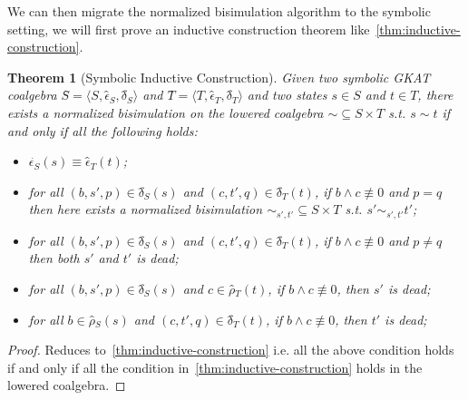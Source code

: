 \documentclass{extarticle}
\newtheorem{theorem}{Theorem}
\begin{document}
We can then migrate the normalized bisimulation algorithm to the symbolic setting, we will first prove an inductive construction theorem like~\cref{thm:inductive-construction}.

\begin{theorem}[Symbolic Inductive Construction]\label{thm:symb-inductive-construction}
    Given two symbolic GKAT coalgebra \(Ŝ = ⟨S, ϵ̂_S, δ̂_S⟩\) and \(T̂ = ⟨T, ϵ̂_T, δ̂_T⟩\) and two states \(s ∈ S\) and \(t ∈ T\), there exists a normalized bisimulation on the lowered coalgebra \({∼} ⊆ S × T\) s.t. \(s ∼ t\) if and only if all the following holds:
    \begin{itemize}
        \item \(ϵ̂_S(s) ≡ ϵ̂_T(t)\);
        \item for all \((b, s', p) ∈ δ̂_S(s)\) and \((c, t', q) ∈ δ̂_T(t)\), if \(b ∧ c ≢ 0\) and \(p = q\) then here exists a normalized bisimulation \({∼_{s',t'}} ⊆ S × T\) s.t. \(s' ∼_{s',t'} t'\);
        \item for all \((b, s', p) ∈ δ̂_S(s)\) and \((c, t', q) ∈ δ̂_T(t)\), if \(b ∧ c ≢ 0\) and \(p ≠ q\) then both \(s'\) and \(t'\) is dead;  
        \item for all \((b, s', p) ∈ δ̂_S(s)\) and \(c ∈ ρ̂_T(t)\), if \(b ∧ c ≢ 0\), then \(s'\) is dead;
        \item for all \(b ∈ ρ̂_S(s)\) and \((c, t', q) ∈ δ̂_T(t)\), if \(b ∧ c ≢ 0\), then \(t'\) is dead;
    \end{itemize}
\end{theorem}

\begin{proof}
    Reduces to~\cref{thm:inductive-construction} i.e. all the above condition holds if and only if all the condition in~\cref{thm:inductive-construction} holds in the lowered coalgebra.
\end{proof}





















\end{document}
